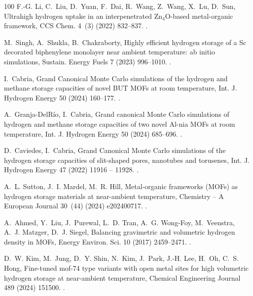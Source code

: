 \documentclass[review]{elsarticle}
\begin{document}
\begin{thebibliography}{100}
F.-G. Li, C.~Liu, D.~Yuan, F.~Dai, R.~Wang, Z.~Wang, X.~Lu, D.~Sun, Ultrahigh
  hydrogen uptake in an interpenetrated {Zn}$_4${O}-based metal-organic
  framework, CCS Chem. 4~(3) (2022) 832--837.
\newblock \href {https://doi.org/10.31635/ccschem.021.202000738}
  {}.

M.~Singh, A.~Shukla, B.~Chakraborty, Highly efficient hydrogen storage of a
  {Sc} decorated biphenylene monolayer near ambient temperature: ab initio
  simulations, Sustain. Energy Fuels 7 (2023) 996--1010.
\newblock \href {https://doi.org/10.1039/D2SE01351G}
  {}.

I.~Cabria, Grand {Canonical} {Monte} {Carlo} simulations of the hydrogen and
  methane storage capacities of novel {BUT} {MOFs} at room temperature, Int. J.
  Hydrogen Energy 50 (2024) 160--177.
\newblock \href {https://doi.org/10.1016/j.ijhydene.2023.06.298}
  {}.

A.~Granja-DelRío, I.~Cabria, Grand canonical {Monte} {Carlo} simulations of
  hydrogen and methane storage capacities of two novel {Al}-nia {MOF}s at room
  temperature, Int. J. Hydrogen Energy 50 (2024) 685--696.
\newblock \href {https://doi.org/10.1016/j.ijhydene.2023.08.023}
  {}.

D.~Caviedes, I.~Cabria, {G}rand {C}anonical {M}onte {C}arlo simulations of the
  hydrogen storage capacities of slit-shaped pores, nanotubes and torusenes,
  Int. J. Hydrogen Energy 47 (2022) 11916 -- 11928.
\newblock \href {https://doi.org/10.1016/j.ijhydene.2022.01.229}
  {}.

A.~L. Sutton, J.~I. Mardel, M.~R. Hill, Metal-organic frameworks ({MOFs}) as
  hydrogen storage materials at near-ambient temperature, Chemistry – A
  European Journal 30~(44) (2024) e202400717.
\newblock \href {https://doi.org/10.1002/chem.202400717}
  {}.

A.~Ahmed, Y.~Liu, J.~Purewal, L.~D. Tran, A.~G. Wong-Foy, M.~Veenstra, A.~J.
  Matzger, D.~J. Siegel, Balancing gravimetric and volumetric hydrogen density
  in {MOFs}, Energy Environ. Sci. 10 (2017) 2459--2471.
\newblock \href {https://doi.org/10.1039/C7EE02477K}
  {}.

D.~W. Kim, M.~Jung, D.~Y. Shin, N.~Kim, J.~Park, J.-H. Lee, H.~Oh, C.~S. Hong,
  Fine-tuned mof-74 type variants with open metal sites for high volumetric
  hydrogen storage at near-ambient temperature, Chemical Engineering Journal
  489 (2024) 151500.
\newblock \href {https://doi.org/10.1016/j.cej.2024.151500}
  {}.


\end{thebibliography}
\end{document}
